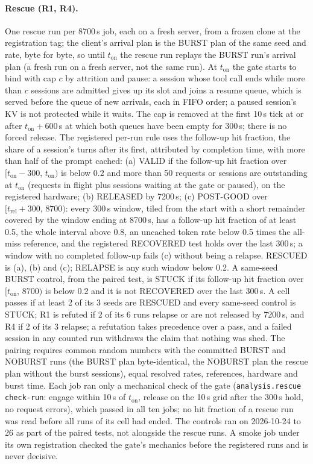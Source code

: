 \paragraph{Rescue (R1, R4).} One rescue run per 8700\,s job, each on a fresh server, from a frozen clone at the registration tag; the client's arrival plan is the BURST plan of the same seed and rate, byte for byte, so until $t_{\mathrm{on}}$ the rescue run replays the BURST run's arrival plan (a fresh run on a fresh server, not the same run). At $t_{\mathrm{on}}$ the gate starts to bind with cap $c$ by attrition and pause: a session whose tool call ends while more than $c$ sessions are admitted gives up its slot and joins a resume queue, which is served before the queue of new arrivals, each in FIFO order; a paused session's KV is not protected while it waits. The cap is removed at the first 10\,s tick at or after $t_{\mathrm{on}}+600$\,s at which both queues have been empty for 300\,s; there is no forced release. The registered per-run rule uses the follow-up hit fraction, the share of a session's turns after its first, attributed by completion time, with more than half of the prompt cached: (a) VALID if the follow-up hit fraction over $[t_{\mathrm{on}}-300,\,t_{\mathrm{on}})$ is below 0.2 and more than 50 requests or sessions are outstanding at $t_{\mathrm{on}}$ (requests in flight plus sessions waiting at the gate or paused), on the registered hardware; (b) RELEASED by 7200\,s; (c) POST-GOOD over $[t_{\mathrm{rel}}+300,\,8700)$: every 300\,s window, tiled from the start with a short remainder covered by the window ending at 8700\,s, has a follow-up hit fraction of at least 0.5, the whole interval above 0.8, an uncached token rate below 0.5 times the all-miss reference, and the registered RECOVERED test holds over the last 300\,s; a window with no completed follow-up fails (c) without being a relapse. RESCUED is (a), (b) and (c); RELAPSE is any such window below 0.2. A same-seed BURST control, from the paired test, is STUCK if its follow-up hit fraction over $[t_{\mathrm{on}},\,8700)$ is below 0.2 and it is not RECOVERED over the last 300\,s. A cell passes if at least 2 of its 3 seeds are RESCUED and every same-seed control is STUCK; R1 is refuted if 2 of its 6 runs relapse or are not released by 7200\,s, and R4 if 2 of its 3 relapse; a refutation takes precedence over a pass, and a failed session in any counted run withdraws the claim that nothing was shed. The pairing requires common random numbers with the committed BURST and NOBURST runs (the BURST plan byte-identical, the NOBURST plan the rescue plan without the burst sessions), equal resolved rates, references, hardware and burst time. Each job ran only a mechanical check of the gate (\texttt{analysis.rescue check-run}: engage within 10\,s of $t_{\mathrm{on}}$, release on the 10\,s grid after the 300\,s hold, no request errors), which passed in all ten jobs; no hit fraction of a rescue run was read before all runs of its cell had ended. The controls ran on 2026-10-24 to 26 as part of the paired tests, not alongside the rescue runs. A smoke job under its own registration checked the gate's mechanics before the registered runs and is never decisive.


